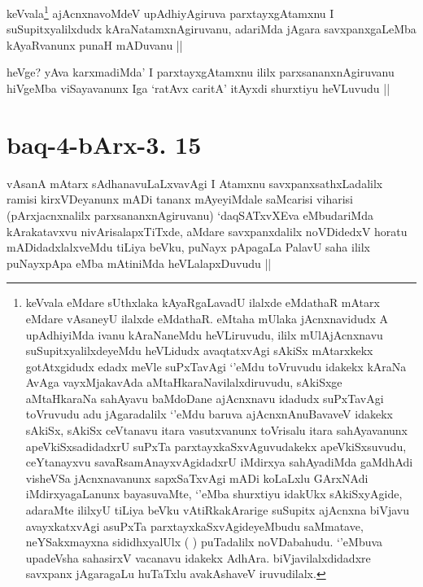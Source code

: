 \begin{artha}
keVvala\footnote[1]{keVvala eMdare sUthxlaka kAyaRgaLavadU ilalxde eMdathaR mAtarx eMdare vAsaneyU ilalxde eMdathaR. eMtaha mUlaka jAcnxnavidudx A upAdhiyiMda ivanu kAraNaneMdu heVLiruvudu, ililx mUlAjAcnxnavu suSupitxyalilxdeyeMdu heVLidudx avaqtatxvAgi sAkiSx mAtarxkekx gotAtxgidudx edadx meVle suPxTavAgi `\stext'eMdu toVruvudu idakekx kAraNa AvAga vayxMjakavAda aMtaHkaraNavilalxdiruvudu, sAkiSxge aMtaHkaraNa sahAyavu baMdoDane ajAcnxnavu idadudx suPxTavAgi toVruvudu adu jAgaradalilx `\stext'eMdu baruva ajAcnxnAnuBavaveV idakekx sAkiSx, sAkiSx ceVtanavu itara vasutxvanunx toVrisalu itara sahAyavanunx apeVkiSxsadidadxrU suPxTa parxtayxkaSxvAguvudakekx apeVkiSxsuvudu, ceYtanayxvu savaRsamAnayxvAgidadxrU iMdirxya sahAyadiMda gaMdhAdi visheVSa jAcnxnavanunx sapxSaTxvAgi mADi koLaLxlu GArxNAdi iMdirxyagaLanunx bayasuvaMte, `\stext'eMba shurxtiyu idakUkx sAkiSxyAgide, adaraMte ililxyU tiLiya beVku vAtiRkakArarige suSupitx ajAcnxna biVjavu avayxkatxvAgi asuPxTa parxtayxkaSxvAgideyeMbudu saMmatave, neYSakxmayxna sididhxyalUlx (   ) puTadalilx noVDabahudu. `\stext'eMbuva upadeVsha sahasirxV vacanavu idakekx AdhAra. biVjavilalxdidadxre savxpanx jAgaragaLu huTaTxlu avakAshaveV iruvudilalx.} ajAcnxnavoMdeV upAdhiyAgiruva parxtayxgAtamxnu I suSupitxyalilxdudx kAraNatamxnAgiruvanu, adariMda jAgara savxpanxgaLeMba kAyaRvanunx punaH mADuvanu ||
\end{artha}

\begin{artha}
heVge? yAva karxmadiMda' I parxtayxgAtamxnu ililx parxsananxnAgiruvanu hiVgeMba viSayavanunx Iga `ratAvx caritA' itAyxdi shurxtiyu heVLuvudu ||
\end{artha}

\section*{baq-4-bArx-3. 15}


\begin{artha}
vAsanA mAtarx sAdhanavuLaLxvavAgi I Atamxnu savxpanxsathxLadalilx ramisi kirxVDeyanunx mADi tananx mAyeyiMdale saMcarisi viharisi (pArxjacnxnalilx parxsananxnAgiruvanu) `daqSATxvXEva eMbudariMda kArakatavxvu nivArisalapxTiTxde, aMdare savxpanxdalilx noVDidedxV horatu mADidadxlalxveMdu tiLiya beVku, puNayx pApagaLa PalavU saha ililx puNayxpApa eMba mAtiniMda heVLalapxDuvudu ||
\end{artha}

